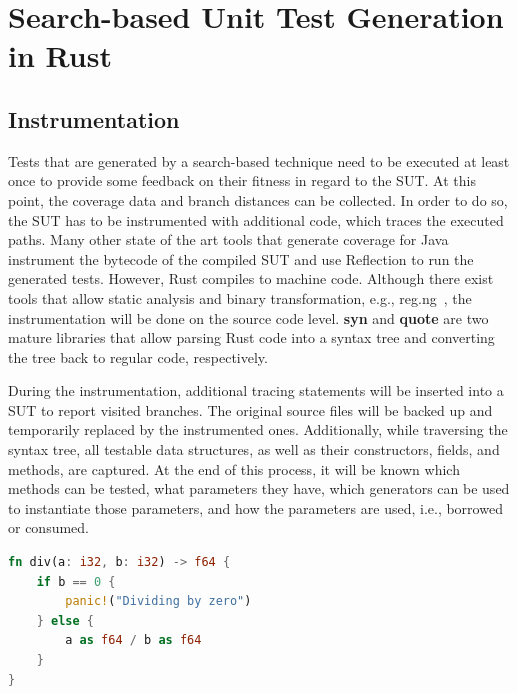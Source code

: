 \documentclass{article}
\begin{document}
\newpage
\section{Search-based Unit Test Generation in Rust}

\subsection{Instrumentation}
Tests that are generated by a search-based technique need to be executed at least once to provide some feedback on their fitness in regard to the \ac{SUT}. At this point, the coverage data and branch distances can be collected. In order to do so, the \ac{SUT} has to be instrumented with additional code, which traces the executed paths. Many other state of the art tools that generate coverage for Java instrument the bytecode of the compiled \ac{SUT} and use Reflection to run the generated tests. However, Rust compiles to machine code. Although there exist tools that allow static analysis and binary transformation, e.g., reg.ng~\cite{DiFederico2018}, the instrumentation will be done on the source code level. \textbf{syn} and \textbf{quote} are two mature libraries that allow parsing Rust code into a syntax tree and converting the tree back to regular code, respectively.

During the instrumentation, additional tracing statements will be inserted into a \ac{SUT} to report visited branches. The original source files will be backed up and temporarily replaced by the instrumented ones. Additionally, while traversing the syntax tree, all testable data structures, as well as their constructors, fields, and methods, are captured. At the end of this process, it will be known which methods can be tested, what parameters they have, which generators can be used to instantiate those parameters, and how the parameters are used, i.e., borrowed or consumed.

\begin{lstlisting}[language=Rust, style=boxed, caption=Division by zero transformation, label=lst:example-testability-transformation]
fn div(a: i32, b: i32) -> f64 {
    if b == 0 {
        panic!("Dividing by zero")
    } else {
        a as f64 / b as f64
    }
}
\end{lstlisting}
\end{document}
